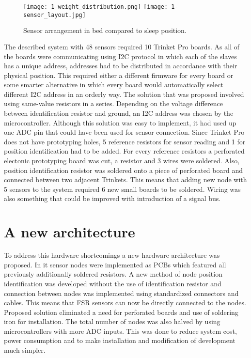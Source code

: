 \begin{figure}[h]
  \begin{center}
    \texttt{[image: 1-weight\_distribution.png]}
    \texttt{[image: 1-sensor\_layout.jpg]}
  \end{center}
  \caption{Sensor arrangement in bed compared to sleep position.}
  \label{fig:sensor-layout}
\end{figure}

The described system with 48 sensors required 10 Trinket Pro boards. As all of the boards were communicating using \ac{I2C} protocol in which each of the slaves has a unique address, addresses had to be distributed in accordance with their physical position. This required either a different firmware for every board or some smarter alternative in which every board would automatically select different I2C address in an orderly way. The solution that was proposed involved using same-value resistors in a series. Depending on the voltage difference between identification resistor and ground, an \ac{I2C} address was chosen by the microcontroller. Although this solution was easy to implement, it had used up one ADC pin that could have been used for sensor connection. Since Trinket Pro does not have prototyping holes, 5 reference resistors for sensor reading and 1 for position identification had to be added. For every reference resistors a perforated electonic prototyping board was cut, a resistor and 3 wires were soldered. Also, position identification resistor was soldered onto a piece of perforated board and connected between two adjacent Trinkets. This means that adding new node with 5 sensors to the system required 6 new small boards to be soldered. Wiring was also something that could be improved with introduction of a signal bus.


\section{A new architecture}

To address this hardware shortcomings a new hardware architecture was proposed. In it sensor nodes were implemented as \ac{PCB}s which featured all previously additionally soldered resistors. A new method of node position identification was developed without the use of identification resistor and connection between nodes was implemented using standardized connectors and cables. This means that \ac{FSR} sensors can now be directly connected to the nodes. Proposed solution eliminated a need for perforated boards and use of soldering iron for installation. The total number of nodes was also halved by using microcontrollers with more \ac{ADC} inputs. This was done to reduce system cost, power consumption and to make installation and modification of development much simpler.

